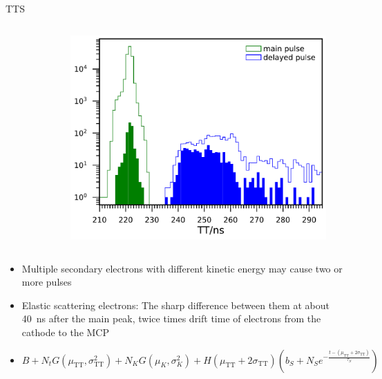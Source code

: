 \documentclass[aspectratio=169]{beamer}
\begin{document}
\begin{frame}{TTS}
\begin{columns}
\begin{column}{0.33\textwidth}
\begin{figure}
            \end{figure}
        \end{column}
        \begin{column}{0.33\textwidth}
            \begin{figure}
                \includegraphics[width=\columnwidth]{../figures/method/triggerDelayedPulse.pdf}    
            \end{figure}
        \end{column}
    \end{columns}
    \begin{itemize}
        \item Multiple secondary electrons with different kinetic energy may cause two or more pulses
        \item Elastic scattering electrons: The sharp difference between them at about \SI{40}{ns} after the main peak, twice times drift time of electrons from the cathode to the MCP
        \item $B+N_tG(\mu_{\mathrm{TT}},\sigma_{\mathrm{TT}}^2)+N_KG(\mu_K,\sigma_K^2)+H(\mu_{\mathrm{TT}}+2\sigma_{\mathrm{TT}})\left(b_S+N_Se^{-\frac{t-(\mu_{\mathrm{TT}}+2\sigma_{\mathrm{TT}})}{\tau_S}}\right)$
    \end{itemize}
\end{frame}
\end{document}
